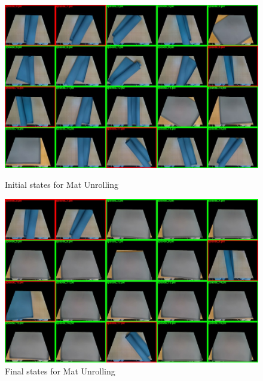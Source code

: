 \begin{figure}
    \centering
    \includegraphics[width=\linewidth]{figure/ijrr24_unroll_mat_ini.jpg}
    \caption{Initial states for Mat Unrolling}
    \label{fig:unroll_mat_ini}
    \centering
    \includegraphics[width=\linewidth]{figure/ijrr24_unroll_mat_last.jpg}
    \caption{Final states for Mat Unrolling}
    \label{fig:unroll_mat_last}
\end{figure}


